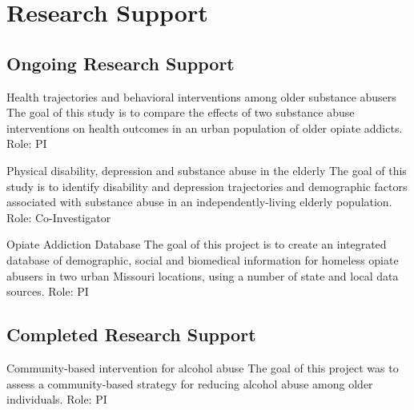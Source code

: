 \documentclass{nihbiosketch}
\begin{document}

\section{Research Support}

\subsection*{Ongoing Research Support}

{Health trajectories and behavioral interventions among older substance abusers}
{The goal of this study is to compare the effects of two substance abuse interventions on health outcomes in an urban population of older opiate addicts.}
{Role: PI}

\bigskip

{Physical disability, depression and substance abuse in the elderly}
{The goal of this study is to identify disability and depression trajectories and demographic factors associated with substance abuse in an independently-living elderly population.}
{Role: Co-Investigator}

\bigskip

{Opiate Addiction Database}
{The goal of this project is to create an integrated database of demographic, social and biomedical information for homeless opiate abusers in two urban Missouri locations, using a number of state and local data sources.}
{Role: PI}



\subsection*{Completed Research Support}

{Community-based intervention for alcohol abuse}
{The goal of this project was to assess a community-based strategy for reducing alcohol abuse among older individuals.}
{Role: PI}
\end{document}
